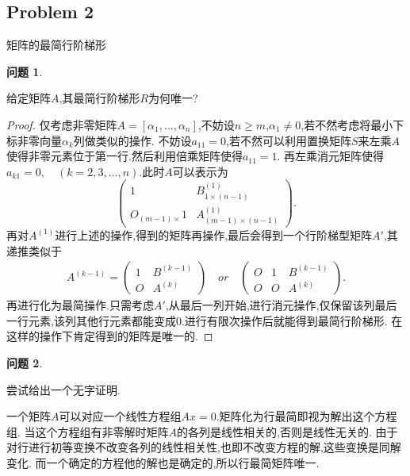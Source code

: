 \documentclass[11pt]{ctexart}
\theoremstyle{definition}
\newtheorem{qqq}{问题}[section]
\numberwithin{equation}{section}
\begin{document}
\subsection{Problem 2}矩阵的最简行阶梯形
\begin{qqq}
    \begin{pinked}
        给定矩阵$A$,其最简行阶梯形$R$为何唯一?
    \end{pinked}
    
\end{qqq}
\begin{proof}
    仅考虑非零矩阵$A=[\alpha_1,\ldots,\alpha_n]$,不妨设$n\geq m$,$\alpha_1\neq 0$,若不然考虑将最小下标非零向量$\alpha_k$列做类似的操作.\newline
    不妨设$a_{11}=0$,若不然可以利用置换矩阵$S$来左乘$A$使得非零元素位于第一行.然后利用倍乘矩阵使得$a_{11}=1$.\newline
    再左乘消元矩阵使得$a_{k1}=0,\quad(k=2,3,\ldots,n)$.此时$A$可以表示为
    $$\begin{pmatrix}
        1&B^{(1)}_{1\times (n-1)}\\O_{(m-1)\times }1&A^{(1)}_{(m-1)\times(n-1)}
    \end{pmatrix}.$$
    再对$A^{(1)}$进行上述的操作,得到的矩阵再操作,最后会得到一个行阶梯型矩阵$A'$,其递推类似于
    \begin{align*}
        A^{(k-1)}=
        \begin{pmatrix}
            1&B^{(k-1)}\\
            O&A^{(k)}
        \end{pmatrix}\quad or \quad
        \begin{pmatrix}
            O& 1&B^{(k-1)}\\
            O&O&A^{(k)}
        \end{pmatrix}.
    \end{align*}
    再进行化为最简操作.只需考虑$A'$,从最后一列开始,进行消元操作,仅保留该列最后一行元素,该列其他行元素都能变成0.进行有限次操作后就能得到最简行阶梯形.\newline
    在这样的操作下肯定得到的矩阵是唯一的.
        
\end{proof}
\begin{qqq}
    \begin{pinked}
    尝试给出一个无字证明.
    \end{pinked}
    
\end{qqq}
\begin{aaa}
    一个矩阵$A$可以对应一个线性方程组$Ax=0$.矩阵化为行最简即视为解出这个方程组.\newline
    当这个方程组有非零解时矩阵$A$的各列是线性相关的,否则是线性无关的.
    由于对行进行初等变换不改变各列的线性相关性,也即不改变方程的解,这些变换是同解变化.\newline
    而一个确定的方程他的解也是确定的,所以行最简矩阵唯一.
\end{aaa}
\end{document}
